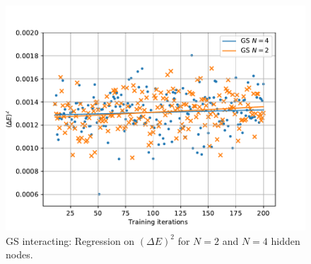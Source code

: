 \documentclass[%
oneside,                 %
final,                   %
10pt]{article}
\begin{document}
\begin{appendices}
\begin{figure}[H]
        \centering 
         \includegraphics[scale=0.8]{../Results/sim_15/Regression_GS_inter.pdf} 
        \caption{GS interacting: Regression on $(\Delta E)^2$ for $N=2$ and $N=4$ hidden nodes. }
        \label{fig:GS_reg_last}   
\end{figure}  


\end{appendices}
\end{document}
